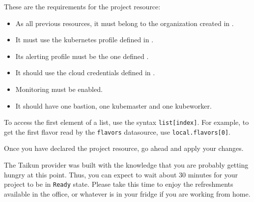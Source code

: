 These are the requirements for the project resource:
\begin{itemize}
  \item As all previous resources, it must belong to the organization created in .
  \item It must use the kubernetes profile defined in .
  \item Its alerting profile must be the one defined .
  \item It should use the cloud credentials defined in .
  \item Monitoring must be enabled.
  \item It should have one bastion, one kubemaster and one kubeworker.
\end{itemize}

\begin{tip}
  To access the first element of a list, use the syntax \texttt{list[index]}.
  For example, to get the first flavor read by the \texttt{flavors} datasource,
  use \texttt{local.flavors[0]}.
\end{tip}

Once you have declared the project resource, go ahead and apply your changes.
\begin{hint}
  The Taikun provider was built with the knowledge that you are probably getting hungry at this point.
  Thus, you can expect to wait about 30 minutes for your project to be in \texttt{Ready} state.
  Please take this time to enjoy the refreshments available in the office, or whatever is
  in your fridge if you are working from home.
\end{hint}
